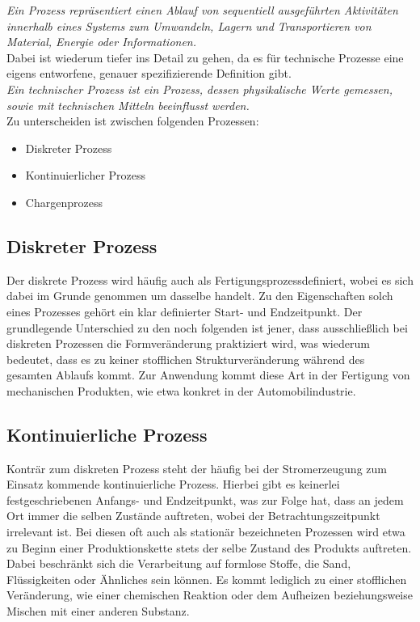 	
	\textit{Ein Prozess repräsentiert einen Ablauf von sequentiell ausgeführten Aktivitäten innerhalb eines Systems zum Umwandeln, Lagern und Transportieren von Material, Energie oder Informationen.}\\

	Dabei ist wiederum tiefer ins Detail zu gehen, da es für technische Prozesse eine eigens entworfene, genauer spezifizierende Definition gibt.\\
	
	\textit{Ein technischer Prozess ist ein Prozess, dessen physikalische Werte gemessen, sowie mit technischen Mitteln beeinflusst werden.}\\
	
	Zu unterscheiden ist zwischen folgenden Prozessen:
	
	\begin{itemize}
		\item Diskreter Prozess
		\item Kontinuierlicher Prozess
		\item Chargenprozess
	\end{itemize}
	
	\subsection{Diskreter Prozess}
	Der diskrete Prozess wird häufig auch als \glqq Fertigungsprozess\grqq\space definiert, wobei es sich dabei im Grunde genommen um dasselbe handelt. Zu den Eigenschaften solch eines Prozesses gehört ein klar definierter Start- und Endzeitpunkt. Der grundlegende Unterschied zu den noch folgenden ist jener, dass ausschließlich bei diskreten Prozessen die Formveränderung praktiziert wird, was wiederum bedeutet, dass es zu keiner stofflichen Strukturveränderung während des gesamten Ablaufs kommt. Zur Anwendung kommt diese Art in der Fertigung von mechanischen Produkten, wie etwa konkret in der Automobilindustrie.
	
	\subsection{Kontinuierliche Prozess}
	Konträr zum diskreten Prozess steht der häufig bei der Stromerzeugung zum Einsatz kommende kontinuierliche Prozess. Hierbei gibt es keinerlei festgeschriebenen Anfangs- und Endzeitpunkt, was zur Folge hat, dass an jedem Ort immer die selben Zustände auftreten, wobei der Betrachtungszeitpunkt irrelevant ist. Bei diesen oft auch als stationär bezeichneten Prozessen wird etwa zu Beginn einer Produktionskette stets der selbe Zustand des Produkts auftreten. Dabei beschränkt sich die Verarbeitung auf formlose Stoffe, die Sand, Flüssigkeiten oder Ähnliches sein können. Es kommt lediglich zu einer stofflichen Veränderung, wie einer chemischen Reaktion oder dem Aufheizen beziehungsweise Mischen mit einer anderen Substanz.
	

